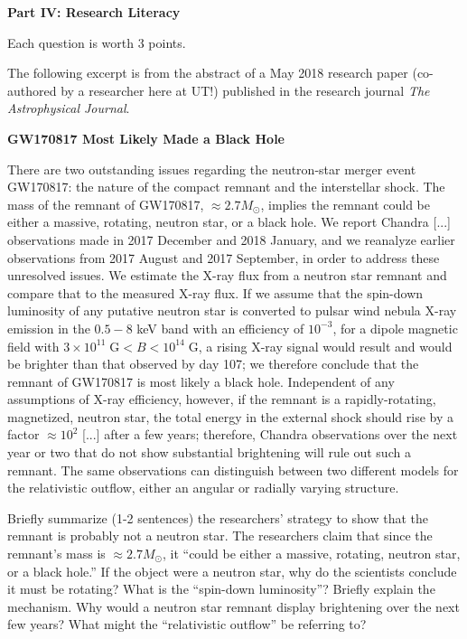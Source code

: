 \documentclass{exam}
\begin{document}
\newpage
\par\noindent \textbf{\large  Part IV: Research Literacy}
	\par\noindent  Each question is worth 3 points.
		\vspace{0.10 in}
	\par\noindent \noindent The following excerpt is from the abstract of a May 2018 research paper (co-authored by a researcher here at UT!) published in the research journal \textit{The Astrophysical Journal}.
		\vspace{0.10 in}
	\par \noindent\textbf{GW170817 Most Likely Made a Black Hole}
	\par There are two outstanding issues regarding the neutron-star merger event GW170817: the nature of the compact remnant and the interstellar shock. The mass of the remnant of GW170817, $\approx 2.7 M_\odot$, implies the remnant could be either a massive, rotating, neutron star, or a black hole. We report Chandra [...] observations made in 2017 December and 2018 January, and we reanalyze earlier observations from 2017 August and 2017 September, in order to address these unresolved issues. We estimate the X-ray flux from a neutron star remnant and compare that to the measured X-ray flux. If we assume that the spin-down luminosity of any putative neutron star is converted to pulsar wind nebula X-ray emission in the $0.5-8$ keV band with an efficiency of $10^{-3}$, for a dipole magnetic field with $3\times 10^{11} \;\mathrm{G} < B < 10^{14} \;\mathrm{G}$, a rising X-ray signal would result and would be brighter than that observed by day 107; we therefore conclude that the remnant of GW170817 is most likely a black hole. Independent of any assumptions of X-ray efficiency, however, if the remnant is a rapidly-rotating, magnetized, neutron star, the total energy in the external shock should rise by a factor $\approx 10^2$ [...] after a few years; therefore, Chandra observations over the next year or two that do not show substantial brightening will rule out such a remnant. The same observations can distinguish between two different models for the relativistic outflow, either an angular or radially varying structure.
\begin{questions}
	\setcounter{question}{55}
	\question Briefly summarize (1-2 sentences) the researchers' strategy to show that the remnant is probably not a neutron star.
	\question The researchers claim that since the remnant's mass is $\approx 2.7 M_\odot$, it ``could be either a massive, rotating, neutron star, or a black hole.'' If the object were a neutron star, why do the scientists conclude it must be rotating?
	\question What is the ``spin-down luminosity''? Briefly explain the mechanism.
	\question Why would a neutron star remnant display brightening over the next few years?
	\question What might the ``relativistic outflow'' be referring to?
\end{questions}
\end{document}
